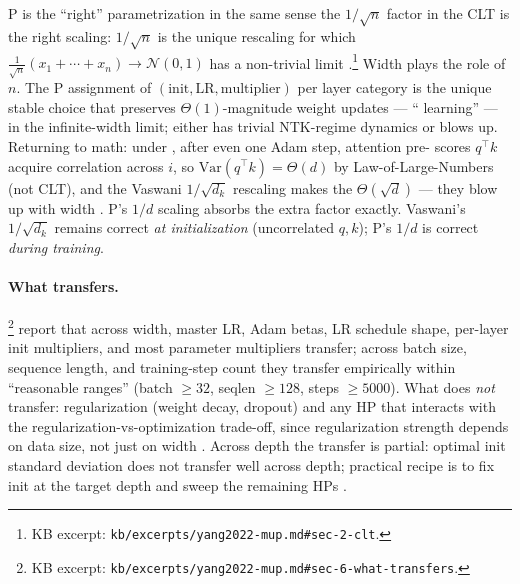 \begin{analogy}
\textmu P is the ``right'' parametrization in the same sense the
$1/\sqrt{n}$ factor in the CLT is the right scaling: $1/\sqrt{n}$ is
the unique rescaling for which $\frac{1}{\sqrt{n}}(x_1 + \cdots + x_n)
\to \mathcal{N}(0, 1)$ has a non-trivial limit
\citep[\S 2]{yang2022-mup}.\footnote{KB excerpt:
\texttt{kb/excerpts/yang2022-mup.md\#sec-2-clt}.} Width plays the role
of $n$. The \textmu P assignment of $(\text{init}, \text{LR},
\text{multiplier})$ per layer category is the unique stable choice
that preserves $\Theta(1)$-magnitude weight updates --- ``
learning'' --- in the infinite-width limit;  either has trivial
NTK-regime dynamics or blows up. Returning to math: under , after
even one Adam step, attention pre- scores $q^\top k$ acquire
correlation across $i$, so $\mathrm{Var}(q^\top k) = \Theta(d)$ by
Law-of-Large-Numbers (not CLT), and the Vaswani $1/\sqrt{d_k}$
rescaling makes the  $\Theta(\sqrt{d})$ --- they blow up with
width \citep[\S 5]{yang2022-mup}. \textmu P's $1/d$ scaling absorbs the
extra factor exactly. Vaswani's $1/\sqrt{d_k}$ remains correct
\emph{at initialization} (uncorrelated $q, k$); \textmu P's $1/d$ is
correct \emph{during training}.
\end{analogy}

\paragraph{What transfers.}
\citet[\S 6]{yang2022-mup}\footnote{KB excerpt:
\texttt{kb/excerpts/yang2022-mup.md\#sec-6-what-transfers}.} report
that across width, master LR, Adam betas, LR schedule shape, per-layer
init multipliers, and most parameter multipliers transfer; across batch
size, sequence length, and training-step count they transfer
empirically within ``reasonable ranges'' (batch $\geq 32$, seqlen
$\geq 128$, steps $\geq 5000$). What does \emph{not} transfer:
regularization (weight decay, dropout) and any HP that interacts with
the regularization-vs-optimization trade-off, since regularization
strength depends on data size, not just on width
\citep[\S 6]{yang2022-mup}. Across depth the transfer is partial:
optimal init standard deviation does not transfer well across depth;
practical recipe is to fix init at the target depth and sweep the
remaining HPs \citep[\S 6.1]{yang2022-mup}.

